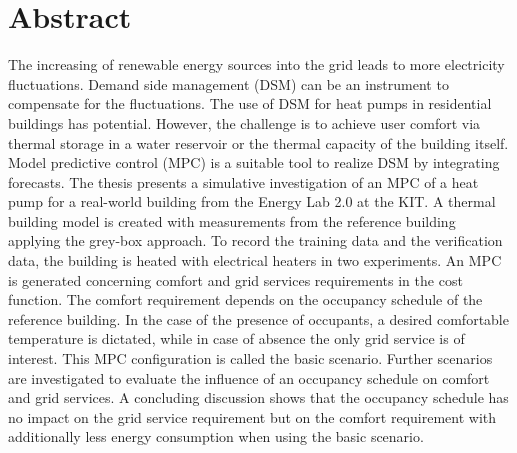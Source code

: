 
\chapter{Abstract}

The increasing of renewable energy sources into the grid leads to more electricity fluctuations. Demand side management (DSM) can be an instrument to compensate for the fluctuations. The use of DSM for heat pumps in residential buildings has potential. However, the challenge is to achieve user comfort via thermal storage in a water reservoir or the thermal capacity of the building itself. Model predictive control (MPC) is a suitable tool to realize DSM by integrating forecasts.\newline
The thesis presents a simulative investigation of an MPC of a heat pump for a real-world building from the Energy Lab 2.0 at the KIT. A thermal building model is created with measurements from the reference building applying the grey-box approach. To record the training data and the verification data, the building is heated with electrical heaters in two experiments.\newline
An MPC is generated concerning comfort and grid services requirements in the cost function. The comfort requirement depends on the occupancy schedule of the reference building. In the case of the presence of occupants, a desired comfortable temperature is dictated, while in case of absence the only grid service is of interest. This MPC configuration is called the basic scenario. Further scenarios are investigated to evaluate the influence of an occupancy schedule on comfort and grid services. A concluding discussion shows that the occupancy schedule has no impact on the grid service requirement but on the comfort requirement with additionally less energy consumption when using the basic scenario.